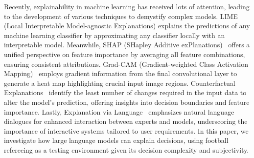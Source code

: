  Recently, explainability in machine learning has received lots of attention, leading to the development of various techniques to demystify complex models. LIME (Local Interpretable Model-agnostic Explanations)\cite{Ribeiro2016Why-arxiv} explains the predictions of any machine learning classifier by approximating any classifier locally with an interpretable model. 
Meanwhile, SHAP (SHapley Additive exPlanations)~\cite{Lundberg2017AUnified-arxiv} offers a unified perspective on feature importance by averaging all feature combinations, ensuring consistent attributions.
Grad-CAM (Gradient-weighted Class Activation Mapping)~\cite{Selvaraju2016GradCAM-arxiv} employs gradient information from the final convolutional layer to generate a heat map highlighting crucial input image regions.
Counterfactual Explanations~\cite{Wachter2017Counterfactual-arxiv} identify the least number of changes required in the input data to alter the model's prediction, offering insights into decision boundaries and feature importance. 
Lastly, Explanation via Language~\cite{Lakkaraju2022Rethinking-arxiv} emphasizes natural language dialogues for enhanced interaction between experts and models, underscoring the importance of interactive systems tailored to user requirements. 
In this paper, we investigate how large language models can explain decisions, using football refereeing as a testing environment given its decision complexity and subjectivity.


